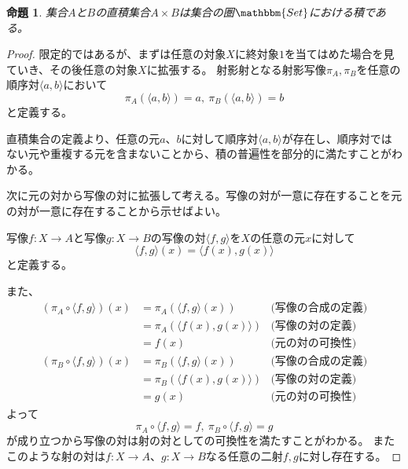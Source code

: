\documentclass[uplatex,dvipdfmx]{jsarticle}
\newcommand{\cat}[1]{\mathbbm{#1}}
\newcommand{\arrow}{\rightarrow}
\newcommand{\tuple}[1]{\langle #1\rangle}
\newcommand{\mor}[3]{#1:#2\arrow #3}
\newtheorem{proof}{証明}[section]
\newtheorem{prop}{命題}[section]
\numberwithin{proof}{subsection}
\numberwithin{prop}{subsection}
\numberwithin{define}{subsection}
\begin{document}
	\begin{prop}
	集合$A$と$B$の直積集合$A\times B$は集合の圏$\cat{Set}$における積である。
	\end{prop}
	\begin{proof}
		限定的ではあるが、まずは任意の対象$X$に終対象$1$を当てはめた場合を見ていき、その後任意の対象$X$に拡張する。
		射影射となる射影写像$\pi_A,\pi_B$を任意の順序対$\tuple{a,b}$において\[\pi_A(\tuple{a,b})=a,\ \pi_B(\tuple{a,b})=b\]と定義する。

		直積集合の定義より、任意の元$a$、$b$に対して順序対$\tuple{a,b}$が存在し、順序対ではない元や重複する元を含まないことから、積の普遍性を部分的に満たすことがわかる。
		\begin{center}
		\end{center}
		次に元の対から写像の対に拡張して考える。写像の対が一意に存在することを元の対が一意に存在することから示せばよい。

		写像$\mor{f}{X}{A}$と写像$\mor{g}{X}{B}$の写像の対$\tuple{f,g}$を$X$の任意の元$x$に対して\[\tuple{f,g}(x)=\tuple{f(x),g(x)}\]と定義する。

		また、
		\begin{align*}
			(\pi_A\circ\tuple{f,g})(x)&=\pi_A(\tuple{f,g}(x))&\text{(写像の合成の定義)}\\
			&=\pi_A(\tuple{f(x),g(x)})&\text{(写像の対の定義)}\\
			&=f(x)&\text{(元の対の可換性)}\\
			(\pi_B\circ\tuple{f,g})(x)&=\pi_B(\tuple{f,g}(x))&\text{(写像の合成の定義)}\\
			&=\pi_B(\tuple{f(x),g(x)})&\text{(写像の対の定義)}\\
			&=g(x)&\text{(元の対の可換性)}
		\end{align*}
		よって\[\pi_A\circ\tuple{f,g}=f,\ \pi_B\circ\tuple{f,g}=g\]が成り立つから写像の対は射の対としての可換性を満たすことがわかる。
		またこのような射の対は$\mor{f}{X}{A}$、$\mor{g}{X}{B}$なる任意の二射$f,g$に対し存在する。


\end{proof}
\end{document}
